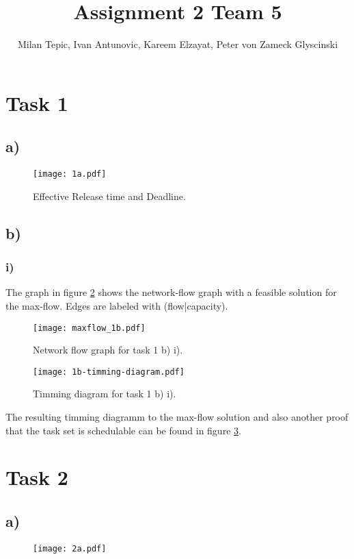 \documentclass[10pt,a4paper]{article}
\author{Milan Tepic, Ivan Antunovic, Kareem Elzayat, Peter von Zameck Glyscinski}
\title{Assignment 2 Team 5}
\begin{document}
\maketitle
\section*{Task 1}
\subsection*{a)}
\begin{figure}[h]
\texttt{[image: 1a.pdf]}
\caption{Effective Release time and Deadline.} 
\label{fig:1a}
\end{figure}
\newpage
\subsection*{b)}
\subsubsection*{i)}
The graph in figure \ref{fig:1bi} shows the network-flow graph with a feasible solution for the max-flow.
Edges are labeled with (flow|capacity).

\begin{figure}[h]
\texttt{[image: maxflow\_1b.pdf]}
\caption{Network flow graph for task 1 b) i).}
\label{fig:1bi}
\end{figure}

\begin{figure}[h]
\texttt{[image: 1b-timming-diagram.pdf]}
\caption{Timming diagram for task 1 b) i).}
\label{fig:1biTimming}
\end{figure}

The resulting timming diagramm to the max-flow solution and also another proof that the task set is schedulable can be found in figure \ref{fig:1biTimming}.
\newpage
\section*{Task 2}
\subsection*{a)}

\begin{figure}[h]
\texttt{[image: 2a.pdf]}
\label{fig:2a}
\end{figure}
\end{document}
